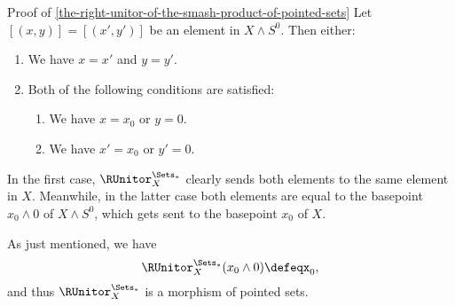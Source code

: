 \begin{Proof}{Proof of \cref{the-right-unitor-of-the-smash-product-of-pointed-sets}}%
    Let $[(x,y)]=[(x',y')]$ be an element in $X\wedge S^{0}$. Then either:
    \begin{enumerate}
        \item We have $x=x'$ and $y=y'$.
        \item Both of the following conditions are satisfied:
            \begin{enumerate}
                \item We have $x=x_{0}$ or $y=0$.
                \item We have $x'=x_{0}$ or $y'=0$.
            \end{enumerate}
    \end{enumerate}
    In the first case, $\RUnitor^{\Sets_{*}}_{X}$ clearly sends both elements to the same element in $X$. Meanwhile, in the latter case both elements are equal to the basepoint $x_{0}\wedge 0$ of $X\wedge S^{0}$, which gets sent to the basepoint $x_{0}$ of $X$.

    As just mentioned, we have
    \[
        \RUnitor^{\Sets_{*}}_{X}(x_{0}\wedge 0)%
        \defeq%
        x_{0},%
    \]%
    and thus $\RUnitor^{\Sets_{*}}_{X}$ is a morphism of pointed sets.


\end{Proof}
